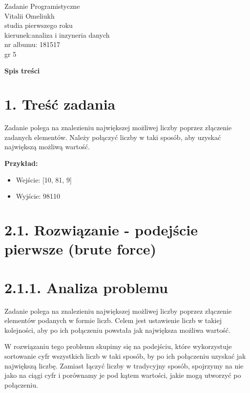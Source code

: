 \documentclass[a4paper,12pt]{article}
\begin{document}
	\vfill
	\begin{center}
		\Large %
		Zadanie Programistyczne \\
		Vitalii Omeliukh  \\
		studia pierwszego roku \\
		kierunek:analiza i inzyneria danych \\
		nr albumu: 181517\\
		gr 5 
	\end{center}
	\vfill
	\thispagestyle{empty}
	\mbox{}
	\newpage
	
	\begin{center}
		\Large\textbf{Spis treści}
	\end{center}
	\vspace{1cm}
	
	\tableofcontents
	
	\newpage
	
	\section{1. Treść zadania}
	
	Zadanie polega na znalezieniu największej możliwej liczby poprzez złączenie zadanych elementów. Należy połączyć liczby w taki sposób, aby uzyskać największą możliwą wartość.  
	
	\textbf{Przykład:}
	\begin{itemize}
		\item Wejście: [10, 81, 9]
		\item Wyjście: 98110
	\end{itemize}
	\section{2.1. Rozwiązanie - podejście pierwsze (brute force)}
	\section{2.1.1. Analiza problemu}
	Zadanie polega na znalezieniu największej możliwej liczby poprzez złączenie elementów podanych w formie liczb. Celem jest ustawienie liczb w takiej kolejności, aby po ich połączeniu powstała jak największa możliwa wartość.
	
	W rozwiązaniu tego problemu skupimy się na podejściu, które wykorzystuje sortowanie cyfr wszystkich liczb w taki sposób, by po ich połączeniu uzyskać jak największą liczbę. Zamiast łączyć liczby w tradycyjny sposób, spojrzymy na nie jako na ciągi cyfr i porównamy je pod kątem wartości, jakie mogą utworzyć po połączeniu.
	
\end{document}
